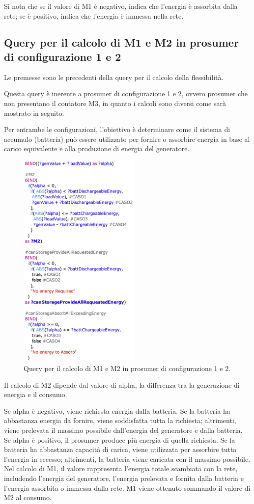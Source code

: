 Si nota che se il valore di M1 è negativo, indica che l'energia è assorbita dalla rete; se è positivo, indica che l'energia è immessa nella rete.

\subsection{Query per il calcolo di M1 e M2 in prosumer di configurazione 1 e 2}

Le premesse sono le precedenti della query per il calcolo della flessibilità.

Questa query è inerente a prosumer di configurazione 1 e 2, ovvero prosumer che non presentano il contatore M3, in quanto i calcoli sono diversi come sarà mostrato in seguito.

Per entrambe le configurazioni, l'obiettivo è determinare come il sistema di accumulo (batteria) può essere utilizzato per fornire o assorbire energia
in base al carico equivalente e alla produzione di energia del generatore.

\begin{figure}[H]
    \centering
    \includegraphics[width=6cm]{images/query_m1m2_config0102.png}
    \caption{Query per il calcolo di M1 e M2 in prosumer di configurazione 1 e 2.}
    \label{fig:query_m1_m2}
\end{figure}

Il calcolo di M2 dipende dal valore di alpha, la differenza tra la generazione di energia e il consumo.

Se alpha è negativo, viene richiesta energia dalla batteria. Se la batteria ha abbastanza energia da fornire, viene soddisfatta tutta la richiesta; altrimenti, viene prelevata il massimo possibile dall'energia del generatore e dalla batteria.
Se alpha è positivo, il prosumer produce più energia di quella richiesta. Se la batteria ha abbastanza capacità di carica, viene utilizzata per assorbire tutta l'energia in eccesso; altrimenti, la batteria viene caricata con il massimo possibile.
Nel calcolo di M1, il valore rappresenta l'energia totale scambiata con la rete, includendo l'energia del generatore, l'energia prelevata e fornita dalla batteria e l'energia assorbita o immessa dalla rete.
M1 viene ottenuto sommando il valore di M2 al consumo.

